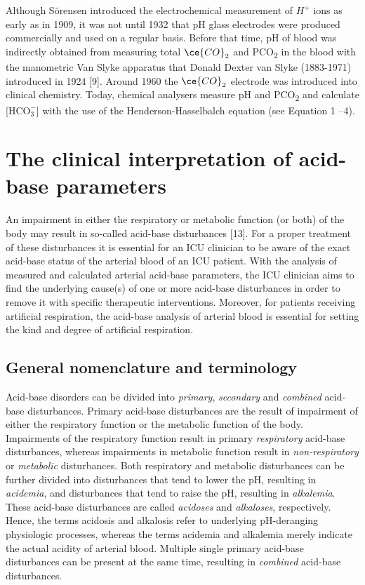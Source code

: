 \documentclass[
  12pt,
  a4paperpaper,
]{report}
\begin{document}
Although Sörensen introduced the electrochemical measurement of
\(H^{+}\) ions as early as in 1909, it was not until 1932 that pH glass
electrodes were produced commercially and used on a regular basis.
Before that time, pH of blood was indirectly obtained from measuring
total \(\ce{CO}_{2}\) and P\textsc{CO}\textsubscript{2} in the blood
with the manometric Van Slyke apparatus that Donald Dexter van Slyke
(1883-1971) introduced in 1924 {[}9{]}. Around 1960 the \(\ce{CO}_{2}\)
electrode was introduced into clinical chemistry. Today, chemical
analysers measure pH and PCO\textsubscript{2} and calculate
{[}\(\text{HCO}_{3}^{-}\){]} with the use of the Henderson-Hasselbalch
equation (see Equation 1 --4).

\hypertarget{the-clinical-interpretation-of-acid-base-parameters}{%
\section{The clinical interpretation of acid-base
parameters}\label{the-clinical-interpretation-of-acid-base-parameters}}

An impairment in either the respiratory or metabolic function (or both)
of the body may result in so-called acid-base disturbances {[}13{]}. For
a proper treatment of these disturbances it is essential for an ICU
clinician to be aware of the exact acid-base status of the arterial
blood of an ICU patient. With the analysis of measured and calculated
arterial acid-base parameters, the ICU clinician aims to find the
underlying cause(s) of one or more acid-base disturbances in order to
remove it with specific therapeutic interventions. Moreover, for
patients receiving artificial respiration, the acid-base analysis of
arterial blood is essential for setting the kind and degree of
artificial respiration.

\hypertarget{general-nomenclature-and-terminology}{%
\subsection{General nomenclature and
terminology}\label{general-nomenclature-and-terminology}}

Acid-base disorders can be divided into \emph{primary}, \emph{secondary}
and \emph{combined} acid-base disturbances. Primary acid-base
disturbances are the result of impairment of either the respiratory
function or the metabolic function of the body. Impairments of the
respiratory function result in primary \emph{respiratory} acid-base
disturbances, whereas impairments in metabolic function result in
\emph{non-respiratory} or \emph{metabolic} disturbances. Both
respiratory and metabolic disturbances can be further divided into
disturbances that tend to lower the pH, resulting in \emph{acidemia},
and disturbances that tend to raise the pH, resulting in
\emph{alkalemia}. These acid-base disturbances are called
\emph{acidoses} and \emph{alkaloses}, respectively. Hence, the terms
acidosis and alkalosis refer to underlying pH-deranging physiologic
processes, whereas the terms acidemia and alkalemia merely indicate the
actual acidity of arterial blood. Multiple single primary acid-base
disturbances can be present at the same time, resulting in
\emph{combined} acid-base disturbances.
\end{document}
